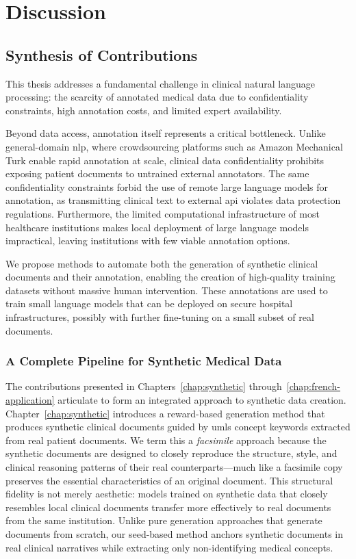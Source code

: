 \chapter{Discussion}
\label{chap:discussion}
\minitoc
\section{Synthesis of Contributions}

This thesis addresses a fundamental challenge in clinical natural language processing: the scarcity of annotated medical data due to confidentiality constraints, high annotation costs, and limited expert availability.

Beyond data access, annotation itself represents a critical bottleneck.
Unlike general-domain \gls{nlp}, where crowdsourcing platforms such as Amazon Mechanical Turk enable rapid annotation at scale, clinical data confidentiality prohibits exposing patient documents to untrained external annotators.
The same confidentiality constraints forbid the use of remote large language models for annotation, as transmitting clinical text to external \gls{api} violates data protection regulations.
Furthermore, the limited computational infrastructure of most healthcare institutions makes local deployment of large language models impractical, leaving institutions with few viable annotation options.

We propose methods to automate both the generation of synthetic clinical documents and their annotation, enabling the creation of high-quality training datasets without massive human intervention.
These annotations are used to train small language models that can be deployed on secure hospital infrastructures, possibly with further fine-tuning on a small subset of real documents.

\subsection{A Complete Pipeline for Synthetic Medical Data}

The contributions presented in Chapters~\ref{chap:synthetic} through~\ref{chap:french-application} articulate to form an integrated approach to synthetic data creation.
Chapter~\ref{chap:synthetic} introduces a reward-based generation method that produces synthetic clinical documents guided by \gls{umls} concept keywords extracted from real patient documents.
We term this a \emph{facsimile} approach because the synthetic documents are designed to closely reproduce the structure, style, and clinical reasoning patterns of their real counterparts—much like a facsimile copy preserves the essential characteristics of an original document.
This structural fidelity is not merely aesthetic: models trained on synthetic data that closely resembles local clinical documents transfer more effectively to real documents from the same institution.
Unlike pure generation approaches that generate documents from scratch, our seed-based method anchors synthetic documents in real clinical narratives while extracting only non-identifying medical concepts.

